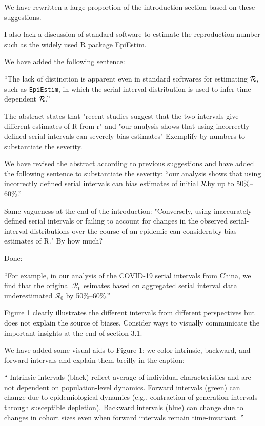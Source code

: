 \documentclass[12pt]{article}
\newcommand{\RR}{\ensuremath{{\cal R}}}
\newcommand{\Ro}{\ensuremath{{\mathcal R}_{0}}\xspace}
\newcommand{\revtext}{\textsf}
\begin{document}
We have rewritten a large proportion of the introduction section based on these suggestions.

\revtext{I also lack a discussion of standard software to estimate the reproduction number such as the widely used R package EpiEstim.}

We have added the following sentence:

``The lack of distinction is apparent even in standard softwares for estimating \RR, such as \texttt{EpiEstim}, in which the serial-interval distribution is used to infer time-dependent \RR \citep{thompson2019improved}.''

\revtext{The abstract states that "recent studies suggest that the two intervals give different estimates of R from r" and "our analysis shows that using incorrectly defined serial intervals can severely bias estimates" Exemplify by numbers to substantiate the severity.}

We have revised the abstract according to previous suggestions and have added the following sentence to substantiate the severity: ``our analysis shows that using incorrectly defined serial intervals can bias estimates of initial \RR by up to 50\%--60\%.''

\revtext{Same vagueness at the end of the introduction: "Conversely, using inaccurately defined serial intervals or failing to account for changes in the observed serial-interval distributions over the course of an epidemic can considerably bias estimates of R." By how much?}

Done:

``For example, in our analysis of the COVID-19 serial intervals from China, we find that the original \Ro esimates based on aggregated serial interval data underestimated \Ro by 50\%--60\%.''

\revtext{Figure 1 clearly illustrates the different intervals from different perspectives but does not explain the source of biases. Consider ways to visually communicate the important insights at the end of section 3.1.}

We have added some visual aids to Figure 1: we color intrinsic, backward, and forward intervals and explain them breifly in the caption:

``
Intrinsic intervals (black) reflect average of individual characteristics and are not dependent on population-level dynamics.
  Forward intervals (green) can change due to epidemiological dynamics (e.g., contraction of generation intervals through susceptible depletion).
  Backward intervals (blue) can change due to changes in cohort sizes even when forward intervals remain time-invariant.
''
\end{document}
